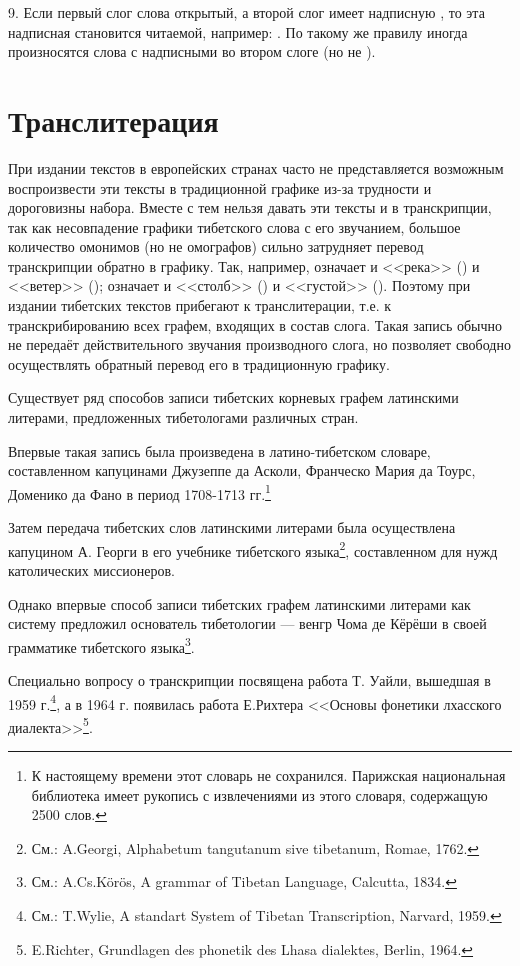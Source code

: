 9. Если первый слог слова открытый, а второй слог имеет надписную , то эта надписная становится читаемой, например: . По такому же правилу иногда произносятся слова с надписными  во втором слоге (но не ).

\section{Транслитерация}

При издании текстов в европейских странах часто не представляется возможным воспроизвести эти тексты в традиционной графике из-за трудности и дороговизны набора. Вместе с тем нельзя давать эти тексты и в транскрипции, так как несовпадение графики тибетского слова с его звучанием, большое количество омонимов (но не омографов) сильно затрудняет перевод транскрипции обратно в графику. Так, например,  означает и <<река>> () и <<ветер>> ();  означает и <<столб>> () и <<густой>> (). Поэтому при издании тибетских текстов прибегают к транслитерации, т.е. к транскрибированию всех графем, входящих в состав слога. Такая запись обычно не передаёт действительного звучания производного слога, но позволяет свободно осуществлять обратный перевод его в традиционную графику.

Существует ряд способов записи тибетских корневых графем латинскими литерами, предложенных тибетологами различных стран.

Впервые такая запись была произведена в латино-тибетском словаре, составленном капуцинами Джузеппе да Асколи, Франческо Мария да Тоурс, Доменико да Фано в период 1708-1713 гг.\footnote[12]{К настоящему времени этот словарь не сохранился. Парижская национальная библиотека имеет рукопись с извлечениями из этого словаря, содержащую 2500 слов.}

Затем передача тибетских слов латинскими литерами была осуществлена капуцином А. Георги в его учебнике тибетского языка\footnote[13]{См.: A.Georgi, Alphabetum tangutanum sive tibetanum, Romae, 1762.}, составленном для нужд католических миссионеров.

Однако впервые способ записи тибетских графем латинскими литерами как систему предложил основатель тибетологии --- венгр Чома де Кёрёши в своей грамматике тибетского языка\footnote[14]{См.: A.Cs.Körös, A grammar of Tibetan Language, Calcutta, 1834.}.

Специально вопросу о транскрипции посвящена работа Т. Уайли, вышедшая в 1959 г.\footnote[15]{См.: T.Wylie, A standart System of Tibetan Transcription, Narvard, 1959.}, а в 1964 г. появилась работа Е.Рихтера <<Основы фонетики лхасского диалекта>>\footnote[16]{E.Richter, Grundlagen des phonetik des Lhasa dialektes, Berlin, 1964.}.

